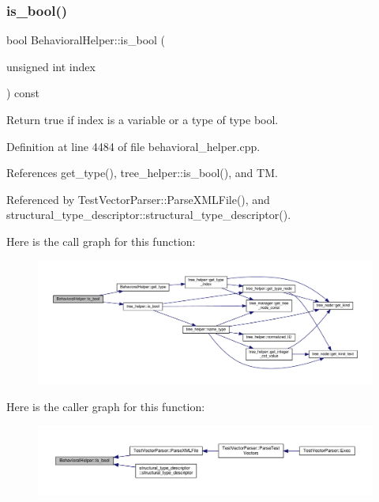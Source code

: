\subsubsection{\texorpdfstring{is\+\_\+bool()}{is\_bool()}}
{\footnotesize\ttfamily bool Behavioral\+Helper\+::is\+\_\+bool (\begin{DoxyParamCaption}\item[{unsigned int}]{index }\end{DoxyParamCaption}) const\hspace{0.3cm}{\ttfamily [virtual]}}



Return true if index is a variable or a type of type bool. 



Definition at line 4484 of file behavioral\+\_\+helper.\+cpp.



References get\+\_\+type(), tree\+\_\+helper\+::is\+\_\+bool(), and TM.



Referenced by Test\+Vector\+Parser\+::\+Parse\+X\+M\+L\+File(), and structural\+\_\+type\+\_\+descriptor\+::structural\+\_\+type\+\_\+descriptor().

Here is the call graph for this function\+:
\nopagebreak
\begin{figure}[H]
\begin{center}
\leavevmode
\includegraphics[width=350pt]{dd/db2/classBehavioralHelper_a50ae88f9b0101175e72f66e8010ef88e_cgraph}
\end{center}
\end{figure}
Here is the caller graph for this function\+:
\nopagebreak
\begin{figure}[H]
\begin{center}
\leavevmode
\includegraphics[width=350pt]{dd/db2/classBehavioralHelper_a50ae88f9b0101175e72f66e8010ef88e_icgraph}
\end{center}
\end{figure}
\mbox{\label{classBehavioralHelper_aa097a0720cb041bb7e647a70d849a3fa}} 
